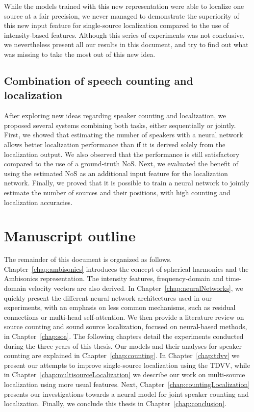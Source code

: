 While the models trained with this new representation were able to localize one source at a fair precision, we never managed to demonstrate the superiority of this new input feature for single-source localization compared to the use of intensity-based features. Although this series of experiments was not conclusive, we nevertheless present all our results in this document, and try to find out what was missing to take the most out of this new idea.

\subsection{Combination of speech counting and localization}

After exploring new ideas regarding speaker counting and localization, we proposed several systems combining both tasks, either sequentially or jointly. First, we showed that estimating the number of speakers with a neural network allows better localization performance than if it is derived solely from the localization output. We also observed that the performance is still satisfactory compared to the use of a ground-truth NoS. Next, we evaluated the benefit of using the estimated NoS as an additional input feature for the localization network. Finally, we proved that it is possible to train a neural network to jointly estimate the number of sources and their positions, with high counting and localization accuracies.

\section{Manuscript outline}

The remainder of this document is organized as follows. Chapter~\ref{chap:ambisonics} introduces the concept of spherical harmonics and the Ambisonics representation. The intensity features, frequency-domain and time-domain velocity vectors are also derived. In Chapter~\ref{chap:neuralNetworks}, we quickly present the different neural network architectures used in our experiments, with an emphasis on less common mechanisms, such as residual connections or multi-head self-attention. We then provide a literature review on source counting and sound source localization, focused on neural-based methods, in Chapter~\ref{chap:soa}. The following chapters detail the experiments conducted during the three years of this thesis. Our models and their analyses for speaker counting are explained in Chapter~\ref{chap:counting}. In Chapter~\ref{chap:tdvv} we present our attempts to improve single-source localization using the TDVV, while in Chapter~\ref{chap:multisourceLocalization} we describe our work on multi-source localization using more usual features. Next, Chapter~\ref{chap:countingLocalization} presents our investigations towards a neural model for joint speaker counting and localization. Finally, we conclude this thesis in Chapter~\ref{chap:conclusion}.
